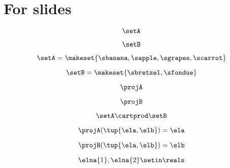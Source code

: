 
\section[For slides]{For slides}

\begin{forslides}

    \begin{equation}
        \label{eq:combination-000}
        \setA
    \end{equation}

    \begin{equation}
        \label{eq:combination-001}
        \setB
    \end{equation}

    \begin{equation}
        \label{eq:combination-002}
        \setA = \makeset{\sbanana, \sapple, \sgrapes, \scarrot}
    \end{equation}

    \begin{equation}
        \label{eq:combination-003}
        \setB = \makeset{ \sbretzel, \sfondue }
    \end{equation}

    \begin{equation}
        \label{eq:combination-004}
        \projA
    \end{equation}

    \begin{equation}
        \label{eq:combination-005}
        \projB
    \end{equation}

    \begin{equation}
        \label{eq:combination-006}
        \setA \cartprod \setB
    \end{equation}

    \begin{equation}
        \label{eq:combination-007}
        \projA(\tup{\ela,\elb}) =  \ela
    \end{equation}

    \begin{equation}
        \label{eq:combination-008}
        \projB(\tup{\ela,\elb}) = \elb
    \end{equation}

    \begin{equation}
        \label{eq:combination-009}
        \elna{1},\elna{2}\setin \reals
    \end{equation}


\end{forslides}
